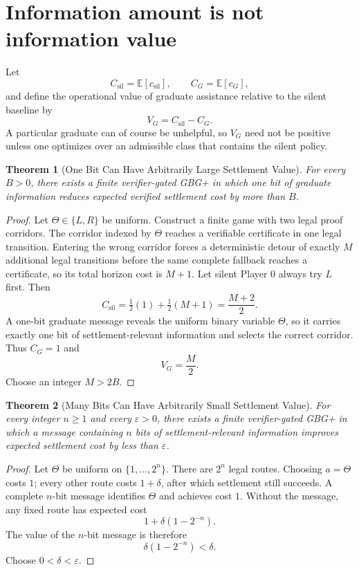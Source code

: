 \documentclass[11pt]{article}
\newtheorem{theorem}{Theorem}[section]
\theoremstyle{definition}
\newcommand{\E}{\mathbb{E}}
\newcommand{\sil}{\mathrm{sil}}
\begin{document}
\section{Information amount is not information value}

Let
\[
C_{\sil}=\E[c_{\sil}],
\qquad
C_G=\E[c_G],
\]
and define the operational value of graduate assistance relative to the silent baseline by
\[
V_G=C_{\sil}-C_G.
\]
A particular graduate can of course be unhelpful, so $V_G$ need not be positive unless one optimizes over an admissible class that contains the silent policy.

\begin{theorem}[One Bit Can Have Arbitrarily Large Settlement Value]
For every $B>0$, there exists a finite verifier-gated GBG+ in which one bit of graduate information reduces expected verified settlement cost by more than $B$.
\end{theorem}

\begin{proof}
Let $\Theta\in\{L,R\}$ be uniform.  Construct a finite game with two legal proof corridors.  The corridor indexed by $\Theta$ reaches a verifiable certificate in one legal transition.  Entering the wrong corridor forces a deterministic detour of exactly $M$ additional legal transitions before the same complete fallback reaches a certificate, so its total horizon cost is $M+1$.  Let silent Player 0 always try $L$ first.  Then
\[
C_{\sil}=\tfrac12(1)+\tfrac12(M+1)=\frac{M+2}{2}.
\]
A one-bit graduate message reveals the uniform binary variable $\Theta$, so it carries exactly one bit of settlement-relevant information and selects the correct corridor.  Thus $C_G=1$ and
\[
V_G=\frac{M}{2}.
\]
Choose an integer $M>2B$.
\end{proof}

\begin{theorem}[Many Bits Can Have Arbitrarily Small Settlement Value]
For every integer $n\ge 1$ and every $\varepsilon>0$, there exists a finite verifier-gated GBG+ in which a message containing $n$ bits of settlement-relevant information improves expected settlement cost by less than $\varepsilon$.
\end{theorem}

\begin{proof}
Let $\Theta$ be uniform on $\{1,\ldots,2^n\}$.  There are $2^n$ legal routes.  Choosing $a=\Theta$ costs $1$; every other route costs $1+\delta$, after which settlement still succeeds.  A complete $n$-bit message identifies $\Theta$ and achieves cost $1$.  Without the message, any fixed route has expected cost
\[
1+\delta(1-2^{-n}).
\]
The value of the $n$-bit message is therefore
\[
\delta(1-2^{-n})<\delta.
\]
Choose $0<\delta<\varepsilon$.
\end{proof}
\end{document}
